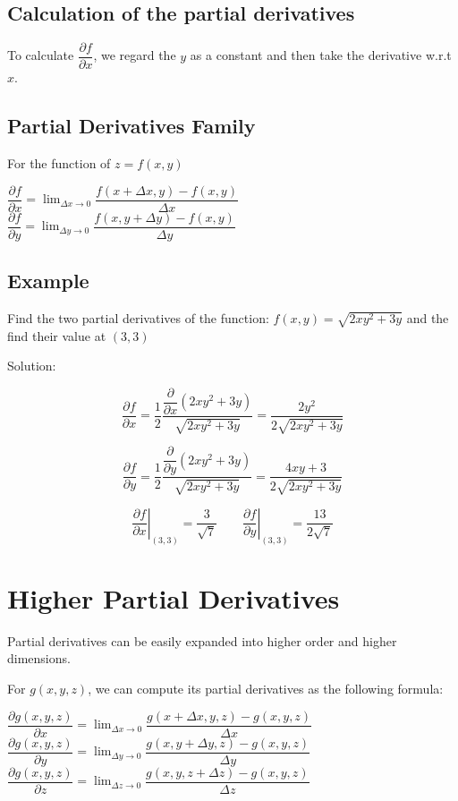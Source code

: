 \documentclass[UTF8,a4paper, 10pt, openany]{svmono}
\begin{document}
\subsection{Calculation of the partial derivatives}
To calculate $\dfrac{\partial f}{\partial x}$, we regard the $y$ as a constant and then take the derivative w.r.t $x$.
\subsection{Partial Derivatives Family}
For the function of $z=f(x,y)$
\begin{center}
$\dfrac{\partial f}{\partial x}=\displaystyle\lim_{\Delta x \to 0}\dfrac{f(x+\Delta x,y)-f(x,y)}{\Delta x}$\\
$\dfrac{\partial f}{\partial y}=\displaystyle\lim_{\Delta y \to 0}\dfrac{f(x,y+\Delta y)-f(x,y)}{\Delta y}$
\end{center}

\subsection{Example}
Find the two partial derivatives of the function: $f(x,y)=\sqrt{2xy^2+3y}$ and the find their value at $(3,3)$

Solution:

\[\dfrac{\partial f}{\partial x}=\dfrac{1}{2}\dfrac{\dfrac{\partial}{\partial x}(2xy^2+3y)}{\sqrt{2xy^2+3y}}=\dfrac{2y^2}{2\sqrt{2xy^2+3y}}\]

\[\dfrac{\partial f}{\partial y}=\dfrac{1}{2}\dfrac{\dfrac{\partial}{\partial y}(2xy^2+3y)}{\sqrt{2xy^2+3y}}=\dfrac{4xy+3}{2\sqrt{2xy^2+3y}}\]

\[\displaystyle\left.\dfrac{\partial f}{\partial x}\right|_{(3,3)}=\dfrac{3}{\sqrt{7}}	\qquad \displaystyle\left.\dfrac{\partial f}{\partial y}\right|_{(3,3)}=\dfrac{13}{2\sqrt{7}}\]


\section{Higher Partial Derivatives}
Partial derivatives can be easily expanded into higher order and higher dimensions.

For $g(x,y,z)$, we can compute its partial derivatives as the following formula:

\begin{center}
$\dfrac{\partial g(x,y,z)}{\partial x}=\displaystyle\lim_{\Delta x\to 0} \dfrac{g(x+\Delta x,y,z)-g(x,y,z)}{\Delta x}$\\
$\dfrac{\partial g(x,y,z)}{\partial y}=\displaystyle\lim_{\Delta y\to 0} \dfrac{g(x,y+\Delta y,z)-g(x,y,z)}{\Delta y}$\\
$\dfrac{\partial g(x,y,z)}{\partial z}=\displaystyle\lim_{\Delta z\to 0} \dfrac{g(x,y,z+\Delta z)-g(x,y,z)}{\Delta z}$
\end{center}
\end{document}
